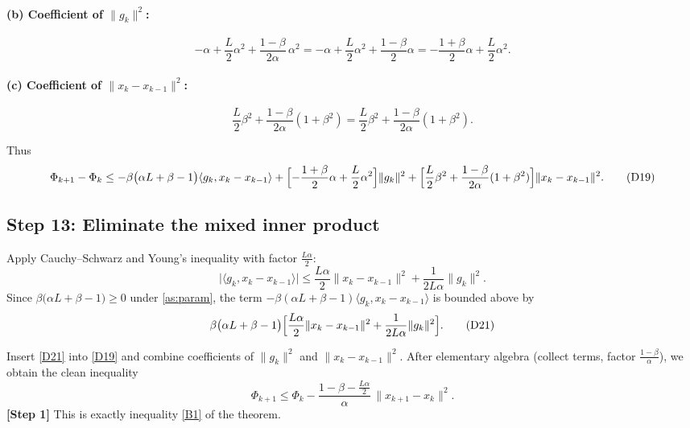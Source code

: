 \documentclass{article}
\begin{document}
\paragraph{(b) Coefficient of $\|g_k\|^2$:}
\[
-\alpha+\frac{L}{2}\alpha^2 +\frac{1-\beta}{2\alpha}\,\alpha^2
= -\alpha+\frac{L}{2}\alpha^2 +\frac{1-\beta}{2}\alpha
= -\frac{1+\beta}{2}\alpha+\frac{L}{2}\alpha^2 .
\tag{D17}
\]

\paragraph{(c) Coefficient of $\|x_k-x_{k-1}\|^2$:}
\[
\frac{L}{2}\beta^2 +\frac{1-\beta}{2\alpha}(1+\beta^2)
= \frac{L}{2}\beta^2 +\frac{1-\beta}{2\alpha}(1+\beta^2) .
\tag{D18}
\]

Thus
\[
\Phi_{k+1}-\Phi_k
\le -\beta\bigl(\alpha L+\beta-1\bigr)\langle g_k, x_k-x_{k-1}\rangle
   +\Bigl[-\frac{1+\beta}{2}\alpha+\frac{L}{2}\alpha^2\Bigr]\|g_k\|^2
   +\Bigl[\frac{L}{2}\beta^2+\frac{1-\beta}{2\alpha}(1+\beta^2)\Bigr]\|x_k-x_{k-1}\|^2 .
\tag{D19}
\]

\subsection*{Step 13: Eliminate the mixed inner product}
Apply Cauchy–Schwarz and Young’s inequality with factor $\frac{L\alpha}{2}$:
\[
\bigl|\langle g_k, x_k-x_{k-1}\rangle\bigr|
\le \frac{L\alpha}{2}\|x_k-x_{k-1}\|^2
   +\frac{1}{2L\alpha}\|g_k\|^2 .
\tag{D20}
\]
Since $\beta\bigl(\alpha L+\beta-1\bigr)\ge 0$ under \eqref{as:param},
the term $-\beta(\alpha L+\beta-1)\langle g_k, x_k-x_{k-1}\rangle$ is bounded above by
\[
\beta\bigl(\alpha L+\beta-1\bigr)\Bigl[\frac{L\alpha}{2}\|x_k-x_{k-1}\|^2
   +\frac{1}{2L\alpha}\|g_k\|^2\Bigr].
\tag{D21}
\]

Insert \eqref{D21} into \eqref{D19} and combine coefficients of $\|g_k\|^2$ and $\|x_k-x_{k-1}\|^2$.
After elementary algebra (collect terms, factor $\frac{1-\beta}{\alpha}$), we obtain the clean inequality
\[
\Phi_{k+1}\le \Phi_k
   -\frac{1-\beta-\frac{L\alpha}{2}}{\alpha}\,\|x_{k+1}-x_k\|^2 .
\tag{D22}
\]
\textbf{[Step 1]} This is exactly inequality \eqref{B1} of the theorem.
\end{document}

